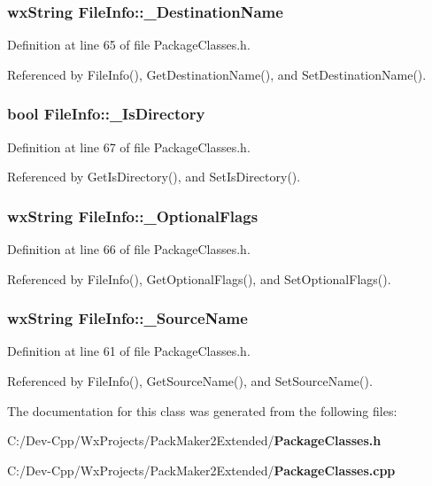 \subsubsection{\setlength{\rightskip}{0pt plus 5cm}wx\-String {\bf File\-Info::\_\-Destination\-Name}\hspace{0.3cm}{\tt  [private]}}\label{class_file_info_15c0569c3c1b4cc88db48973864013d1}




Definition at line 65 of file Package\-Classes.h.

Referenced by File\-Info(), Get\-Destination\-Name(), and Set\-Destination\-Name().
\subsubsection{\setlength{\rightskip}{0pt plus 5cm}bool {\bf File\-Info::\_\-Is\-Directory}\hspace{0.3cm}{\tt  [private]}}\label{class_file_info_394cd4e7bb002b0643457fa12e44b532}




Definition at line 67 of file Package\-Classes.h.

Referenced by Get\-Is\-Directory(), and Set\-Is\-Directory().
\subsubsection{\setlength{\rightskip}{0pt plus 5cm}wx\-String {\bf File\-Info::\_\-Optional\-Flags}\hspace{0.3cm}{\tt  [private]}}\label{class_file_info_b40b78476a8d1220f8c8eeb89ae10628}




Definition at line 66 of file Package\-Classes.h.

Referenced by File\-Info(), Get\-Optional\-Flags(), and Set\-Optional\-Flags().
\subsubsection{\setlength{\rightskip}{0pt plus 5cm}wx\-String {\bf File\-Info::\_\-Source\-Name}\hspace{0.3cm}{\tt  [private]}}\label{class_file_info_58d547490b9e1220e8a3aaa7e94e0140}




Definition at line 61 of file Package\-Classes.h.

Referenced by File\-Info(), Get\-Source\-Name(), and Set\-Source\-Name().

The documentation for this class was generated from the following files:\begin{CompactItemize}
\item 
C:/Dev-Cpp/Wx\-Projects/Pack\-Maker2Extended/{\bf Package\-Classes.h}\item 
C:/Dev-Cpp/Wx\-Projects/Pack\-Maker2Extended/{\bf Package\-Classes.cpp}\end{CompactItemize}

